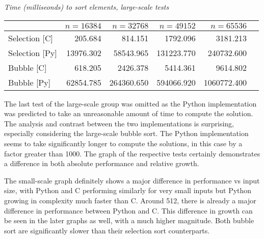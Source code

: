 \documentclass{article}
\begin{document}
\begin{center}
	\textit{Time (milliseonds) to sort elements, large-scale tests}
	\begin{tabular}{l | r | r | r | r | r}
		& $n=16384$ & $n=32768$ & $n=49152$ & $n=65536$ \\ \hline
		Selection [C] & 205.684 & 814.151 & 1792.096 & 3181.213 \\ \hline
		Selection [Py] & 13976.302 & 58543.965 & 131223.770 & 240732.600 \\ \hline
		Bubble [C] & 618.205 & 2426.378 & 5414.361 & 9614.802 \\ \hline
		Bubble [Py] & 62854.785 & 264360.650 & 594066.920 & 1060772.400 \\
	\end{tabular}
\end{center}

The last test of the large-scale group was omitted as the Python implementation was predicted to take an unreasonable amount of time to compute the solution. The analysis and contrast between the two implementations is surprising, especially considering the large-scale bubble sort. The Python implementation seems to take significantly longer to compute the solutions, in this case by a factor greater than 1000. The graph of the respective tests certainly demonstrates a difference in both absolute performance and relative growth.

\begin{center}
\end{center}

The small-scale graph definitely shows a major difference in performance vs input size, with Python and C performing similarly for very small inputs but Python growing in complexity much faster than C. Around 512, there is already a major difference in performance between Python and C. This difference in growth can be seen in the later graphs as well, with a much higher magnitude. Both bubble sort are significantly slower than their selection sort counterparts.
\end{document}
